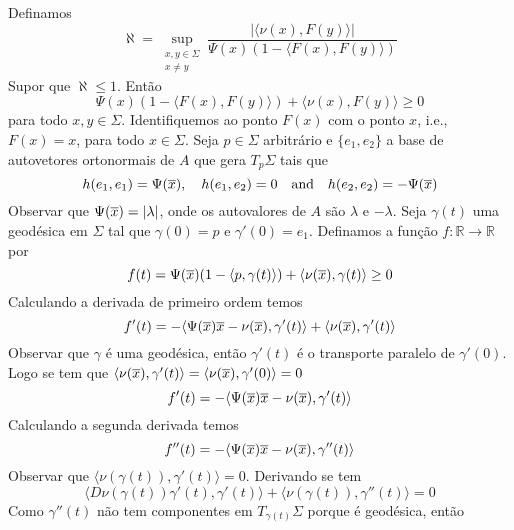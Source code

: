 Definamos
\begin{equation*}
	\aleph = \sup_{\substack{x,y \in \Sigma\\ x \neq y}} \frac{| \langle  \nu(x), F(y) \rangle |}{\Psi(x) (1 - \langle F(x), F(y) \rangle)}
\end{equation*}
Supor que $\aleph \leq 1$. Então
\begin{equation*}
	\Psi(x) (1 - \langle F(x), F(y) \rangle) + \langle \nu(x), F(y) \rangle \geq 0
\end{equation*}
para todo $ x,y \in \Sigma $. Identifiquemos ao ponto $F(x)$ com o ponto $x$, i.e., $F(x) = x$, para todo $x \in \Sigma$. Seja $p \in \Sigma$ arbitrário e $\{ e_1, e_2 \}$ a base de autovetores ortonormais de $A$ que gera $T_{p} \Sigma$ tais que
\begin{equation*}
	h(e_1,e_1) = \Psi(\overline{x}), \quad h(e_1,e_2)=0 \quad \text{and} \quad h(e_2,e_2) = -\Psi(\overline{x})
\end{equation*}
Observar que $\Psi(\overline{x}) = |\lambda|$, onde os autovalores de $A$ são $\lambda$ e $-\lambda$.
Seja $\gamma(t)$ uma geodésica em $\Sigma$ tal que $\gamma(0)=p$ e $\gamma'(0)=e_1$. Definamos a função $f: \mathbb{R} \rightarrow \mathbb{R}$ por
\begin{equation*}
	f(t) = \Psi(\overline{x}) (1 - \langle p, \gamma(t) \rangle) + \langle \nu(\overline{x}), \gamma(t) \rangle \geq 0
\end{equation*}
Calculando a derivada de primeiro ordem temos
\begin{equation*}
	f'(t) = -\langle \Psi(\overline{x}) \overline{x} - \nu(\overline{x}), \gamma'(t) \rangle + \langle \nu(\overline{x}), \gamma'(t) \rangle
\end{equation*}
Observar que $ \gamma $ é uma geodésica, então $ \gamma'(t) $ é  o transporte paralelo de $ \gamma'(0) $. Logo se tem que $ \langle \nu(\overline{x}), \gamma'(t) \rangle = \langle \nu(\overline{x}), \gamma'(0) \rangle = 0 $
\begin{equation*}
	f'(t) = -\langle \Psi(\overline{x}) \overline{x} - \nu(\overline{x}), \gamma'(t) \rangle
\end{equation*}
Calculando a segunda derivada temos
\begin{equation*}
	f''(t) = -\langle \Psi(\overline{x}) \overline{x} - \nu(\overline{x}), \gamma''(t) \rangle
\end{equation*}
Observar que $ \langle \nu(\gamma(t)), \gamma'(t) \rangle = 0 $. Derivando se tem
\begin{equation*}	\langle D \nu(\gamma(t)) \gamma'(t), \gamma'(t) \rangle + \langle \nu(\gamma(t)), \gamma''(t) \rangle = 0
\end{equation*}
Como $\gamma''(t)$ não tem componentes em $T_{\gamma(t)} \Sigma$ porque é geodésica, então
